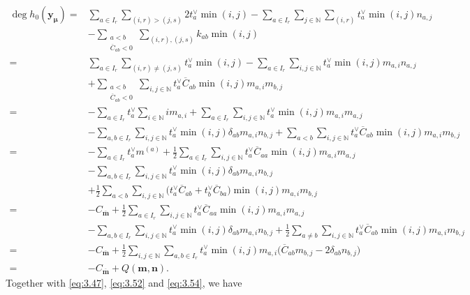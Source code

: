 \documentclass[pdftex]{sigma}
\numberwithin{equation}{section}
\begin{document}
\begin{align*}
\deg h_0(\mathbf{y}_{\bm{\mu}})
={}&\sum_{a\in I_r}\sum_{(i,r)>(j,s)}2t_a^{\vee}\min(i,j)-\sum_{a\in I_r}\sum_{j\in\mathbb{N}}\sum_{(i,r)} t_a^{\vee}\min(i,j)n_{a,j}\\
&-\sum_{\substack{a<b\\ \overline{C}_{ab}<0}}\sum_{(i,r),(j,s)}k_{ab}\min(i,j)\\
={}&\sum_{a\in I_r}\sum_{(i,r)\neq(j,s)}t_a^{\vee}\min(i,j)-\sum_{a\in I_r}\sum_{i,j\in\mathbb{N}} t_a^{\vee}\min(i,j) m_{a,i}n_{a,j}\\
&+\sum_{\substack{a<b\\ \overline{C}_{ab}<0}}\sum_{i,j\in\mathbb{N}}t_a^{\vee}\overline{C}_{ab}\min(i,j)m_{a,i}m_{b,j}\\
={}&-\sum_{a\in I_r}t_a^{\vee}\sum_{i\in\mathbb{N}}im_{a,i}+\sum_{a\in I_r}\sum_{i,j\in\mathbb{N}}t_a^{\vee}\min(i,j)m_{a,i}m_{a,j}\\
&-\sum_{a,b\in I_r}\sum_{i,j\in\mathbb{N}} t_a^{\vee}\min(i,j)\delta_{ab}m_{a,i}n_{b,j}+\sum_{a<b}\sum_{i,j\in\mathbb{N}}t_a^{\vee}\overline{C}_{ab}\min(i,j)m_{a,i}m_{b,j}\\
={}&-\sum_{a\in I_r}t_a^{\vee}m^{(a)}+\frac{1}{2}\sum_{a\in I_r}\sum_{i,j\in\mathbb{N}}t_a^{\vee}\overline{C}_{aa}\min(i,j) m_{a,i}m_{a,j}\\
&-\sum_{a,b\in I_r}\sum_{i,j\in\mathbb{N}} t_a^{\vee}\min(i,j)\delta_{ab}m_{a,i}n_{b,j}\\
&+\frac{1}{2}\sum_{a<b}\sum_{i,j\in\mathbb{N}}\bigl(t_a^{\vee}\overline{C}_{ab}+t_b^{\vee}\overline{C}_{ba}\bigr)\min(i,j)m_{a,i}m_{b,j}\\
={}&-C_{\overline{\mathbf{m}}}+\frac{1}{2}\sum_{a\in I_r}\sum_{i,j\in\mathbb{N}}t_a^{\vee}\overline{C}_{aa}\min(i,j) m_{a,i}m_{a,j}\\
&-\sum_{a,b\in I_r}\sum_{i,j\in\mathbb{N}} t_a^{\vee}\min(i,j)\delta_{ab}m_{a,i}n_{b,j}+\frac{1}{2}\sum_{a\neq b}\sum_{i,j\in\mathbb{N}}t_a^{\vee}\overline{C}_{ab}\min(i,j)m_{a,i}m_{b,j}\\
={}&-C_{\overline{\mathbf{m}}}+\frac{1}{2}\sum_{i,j\in\mathbb{N}} \sum_{a,b\in I_r}t_a^{\vee}\min(i,j)m_{a,i}\bigl( \overline{C}_{ab}m_{b,j}-2\delta_{ab}n_{b,j}\bigr)\\
={}&-C_{\overline{\mathbf{m}}}+Q(\mathbf{m},\mathbf{n}).
\end{align*}
Together with \eqref{eq:3.47}, \eqref{eq:3.52} and \eqref{eq:3.54}, we have
\end{document}
